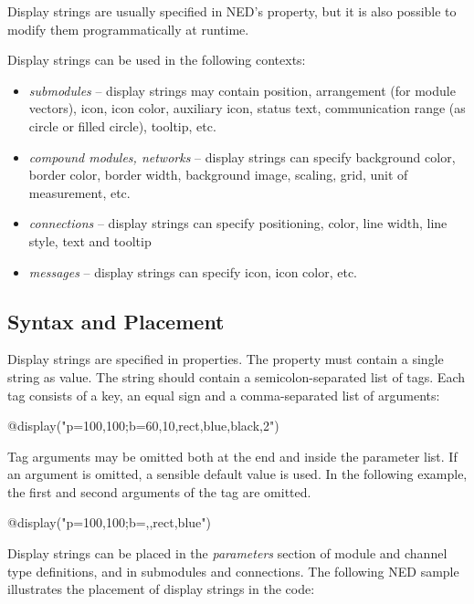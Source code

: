 Display strings are usually specified in NED's  property,
but it is also possible to modify them programmatically at runtime.

Display strings can be used in the following contexts:
\begin{itemize}
  \item \textit{submodules} -- display strings may contain position, arrangement
        (for module vectors), icon, icon color, auxiliary icon, status text,
        communication range (as circle or filled circle), tooltip, etc.
  \item \textit{compound modules, networks} -- display strings can specify
        background color, border color, border width,
        background image, scaling, grid, unit of measurement, etc.
  \item \textit{connections} -- display strings can specify positioning, color,
        line width, line style, text and tooltip
  \item \textit{messages} -- display strings can specify icon, icon color, etc.
\end{itemize}


\subsection{Syntax and Placement}
\label{sec:graphics:displaystring-syntax-and-placement}

Display strings are specified in  properties. The property
must contain a single string as value. The string should contain a
semicolon-separated list of tags. Each tag consists of a key, an equal sign
and a comma-separated list of arguments:

\begin{ned}
@display("p=100,100;b=60,10,rect,blue,black,2")
\end{ned}

Tag arguments may be omitted both at the end and inside the parameter list.
If an argument is omitted, a sensible default value is used. In the following
example, the first and second arguments of the  tag are omitted.

\begin{ned}
@display("p=100,100;b=,,rect,blue")
\end{ned}

Display strings can be placed in the \textit{parameters} section of module
and channel type definitions, and in submodules and connections. The
following NED sample illustrates the placement of display strings in the
code:

